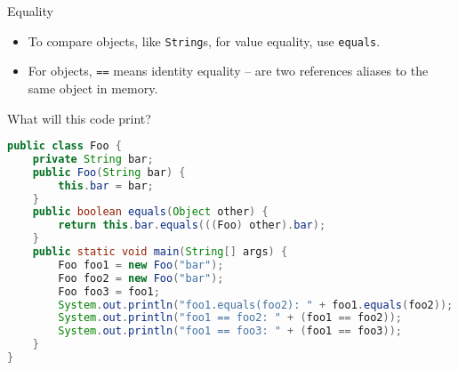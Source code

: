 \documentclass{beamer}
\begin{document}
\begin{frame}[fragile]{Equality}
\vspace{-.05in}
\begin{itemize}
\item To compare objects, like {\tt String}s, for value equality, use {\tt equals}.
\item For objects, {\tt ==} means identity equality -- are two references aliases to the same object in memory.
\end{itemize}

What will this code print?
\begin{lstlisting}[language=Java]
public class Foo {
    private String bar;
    public Foo(String bar) {
        this.bar = bar;
    }
    public boolean equals(Object other) {
        return this.bar.equals(((Foo) other).bar);
    }
    public static void main(String[] args) {
        Foo foo1 = new Foo("bar");
        Foo foo2 = new Foo("bar");
        Foo foo3 = foo1;
        System.out.println("foo1.equals(foo2): " + foo1.equals(foo2));
        System.out.println("foo1 == foo2: " + (foo1 == foo2));
        System.out.println("foo1 == foo3: " + (foo1 == foo3));
    }
}
\end{lstlisting}

\end{frame}







\end{document}
